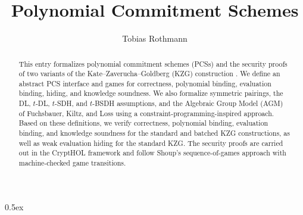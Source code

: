 \documentclass[11pt,a4paper]{article}
\begin{document}
\title{Polynomial Commitment Schemes}
\author{Tobias Rothmann}
\maketitle

\begin{abstract}
This entry formalizes polynomial commitment schemes (PCSs) and the security
proofs of two variants of the Kate--Zaverucha--Goldberg (KZG) construction
\cite{KZG10}. We define an abstract PCS interface and games for correctness,
polynomial binding, evaluation binding, hiding, and knowledge soundness. We
also formalize symmetric pairings, the DL, $t$-DL, $t$-SDH, and $t$-BSDH
assumptions, and the Algebraic Group Model (AGM) of Fuchsbauer, Kiltz, and Loss
\cite{FKL18} using a constraint-programming-inspired approach. Based on these
definitions, we verify correctness, polynomial binding, evaluation binding,
and knowledge soundness for the standard and batched KZG constructions, as
well as weak evaluation hiding for the standard KZG. The security proofs are
carried out in the \textsf{CryptHOL} framework and follow Shoup's
sequence-of-games approach with machine-checked game transitions.
\end{abstract}

\tableofcontents

\parindent 0pt\parskip 0.5ex





\end{document}
